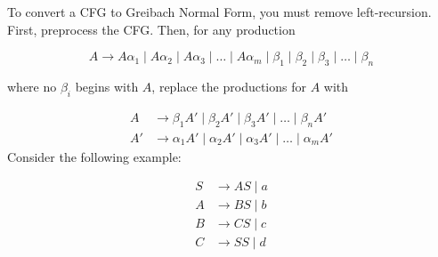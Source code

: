 To convert a CFG to Greibach Normal Form, you must remove left-recursion. First, preprocess the CFG\@. Then, for any production 

\[A\to A\alpha_1 \mid A\alpha_2 \mid A\alpha_3 \mid \hdots \mid A\alpha_m \mid \beta_1 \mid \beta_2 \mid \beta_3 \mid \hdots \mid \beta_n\] 

where no \(\beta_i\) begins with \(A\), replace the productions for \(A\) with 

\begin{align*}
    A  &\to \beta_1 A'\mid \beta_2 A'\mid \beta_3 A'\mid \hdots \mid \beta_n A'\\
    A' &\to \alpha_1 A'\mid \alpha_2 A'\mid \alpha_3 A' \mid \hdots \mid \alpha_m A'
\end{align*}
Consider the following example:

\begin{align*}
    S &\to AS\mid a\\
    A &\to BS\mid b\\
    B &\to CS\mid c\\
    C &\to SS\mid d
\end{align*}


